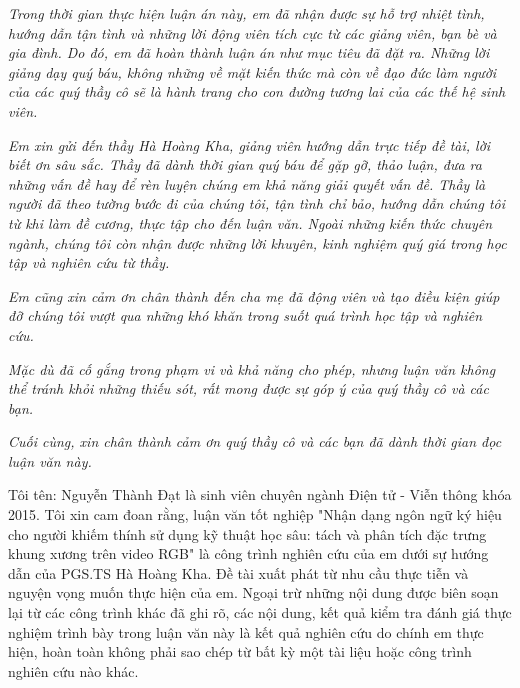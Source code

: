 

\newpage
{}
\thispagestyle{loi_cam_on}
\begin{center}
{}
\end{center}

\textit{Trong thời gian thực hiện luận án này, em đã nhận được sự hỗ trợ nhiệt tình, hướng dẫn tận tình và những lời động viên tích cực từ các giảng viên, bạn bè và gia đình. Do đó, em đã hoàn thành luận án như mục tiêu đã đặt ra. Những lời giảng dạy quý báu, không những về mặt kiến thức mà còn về đạo đức làm người của các quý thầy cô sẽ là hành trang cho con đường tương lai của các thế hệ sinh viên.}

\textit{Em xin gửi đến thầy Hà Hoàng Kha, giảng viên hướng dẫn trực tiếp đề tài, lời biết ơn sâu sắc. Thầy đã dành thời gian quý báu để gặp gỡ, thảo luận, đưa ra những vấn đề hay để rèn luyện chúng em khả năng giải quyết vấn đề. Thầy là người đã theo tường bước đi của chúng tôi, tận tình chỉ bảo, hướng dẫn chúng tôi từ khi làm đề cương, thực tập cho đến luận văn. Ngoài những kiến thức chuyên ngành, chúng tôi còn nhận được những lời khuyên, kinh nghiệm quý giá trong học tập và nghiên cứu từ thầy.}

\textit{Em cũng xin cảm ơn chân thành đến cha mẹ đã động viên và tạo điều kiện giúp đỡ chúng tôi vượt qua những khó khăn trong suốt quá trình học tập và nghiên cứu.}

\textit{Mặc dù đã cố gắng trong phạm vi và khả năng cho phép, nhưng luận văn không thể tránh khỏi những thiếu sót, rất mong được sự góp ý của quý thầy cô và các bạn.}

\textit{Cuối cùng, xin chân thành cảm ơn quý thầy cô và các bạn đã dành thời gian đọc luận văn này.}


\newpage
{}
\thispagestyle{loi_cam_doan}
\begin{center}
{}
\end{center}

\noindent Tôi tên: Nguyễn Thành Đạt là sinh viên chuyên ngành Điện tử - Viễn thông khóa 2015. Tôi xin cam đoan rằng, luận văn tốt nghiệp "Nhận dạng ngôn ngữ ký hiệu cho người khiếm thính sử dụng kỹ thuật học sâu: tách và phân tích đặc trưng khung xương trên video RGB" là công trình nghiên cứu của em dưới sự hướng dẫn của PGS.TS Hà Hoàng Kha. Đề tài xuất phát từ nhu cầu thực tiễn và nguyện vọng muốn thực hiện của em. Ngoại trừ những nội dung được biên soạn lại từ các công trình khác đã ghi rõ, các nội dung, kết quả kiểm tra đánh giá thực nghiệm trình bày trong luận văn này là kết quả nghiên cứu do chính em thực hiện, hoàn toàn không phải sao chép từ bất kỳ một tài liệu hoặc công trình nghiên cứu nào khác.

